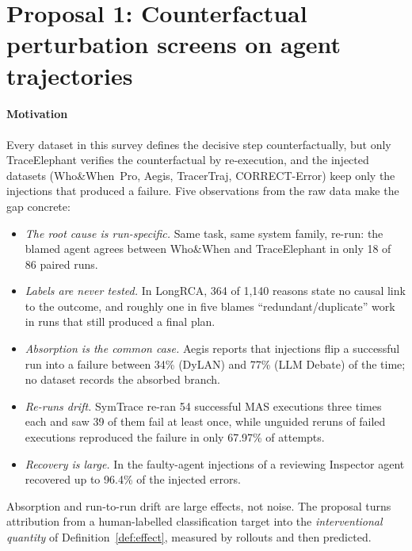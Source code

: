 \documentclass[10pt,a4paper]{article}
\begin{document}

\section{Proposal 1: Counterfactual perturbation screens on agent trajectories}\label{sec:future:perturb}

\paragraph{Motivation} Every dataset in this survey defines the decisive step counterfactually, but only TraceElephant verifies the counterfactual by re-execution, and the injected datasets (Who\&When~Pro, Aegis, TracerTraj, CORRECT-Error) keep only the injections that produced a failure. Five observations from the raw data make the gap concrete:
\begin{itemize}[leftmargin=1.1em]
\item \emph{The root cause is run-specific.} Same task, same system family, re-run: the blamed agent agrees between Who\&When and TraceElephant in only 18 of 86 paired runs.
\item \emph{Labels are never tested.} In LongRCA, 364 of 1,140 reasons state no causal link to the outcome, and roughly one in five blames ``redundant/duplicate'' work in runs that still produced a final plan.
\item \emph{Absorption is the common case.} Aegis reports that injections flip a successful run into a failure between 34\% (DyLAN) and 77\% (LLM Debate) of the time; no dataset records the absorbed branch.
\item \emph{Re-runs drift.} SymTrace \cite{luan2026symtrace} re-ran 54 successful MAS executions three times each and saw 39 of them fail at least once, while unguided reruns of failed executions reproduced the failure in only 67.97\% of attempts.
\item \emph{Recovery is large.} In the faulty-agent injections of \citet{huang2024resilience} a reviewing Inspector agent recovered up to 96.4\% of the injected errors.
\end{itemize}
Absorption and run-to-run drift are large effects, not noise. The proposal turns attribution from a human-labelled classification target into the \emph{interventional quantity} of Definition~\ref{def:effect}, measured by rollouts and then predicted.
\end{document}
